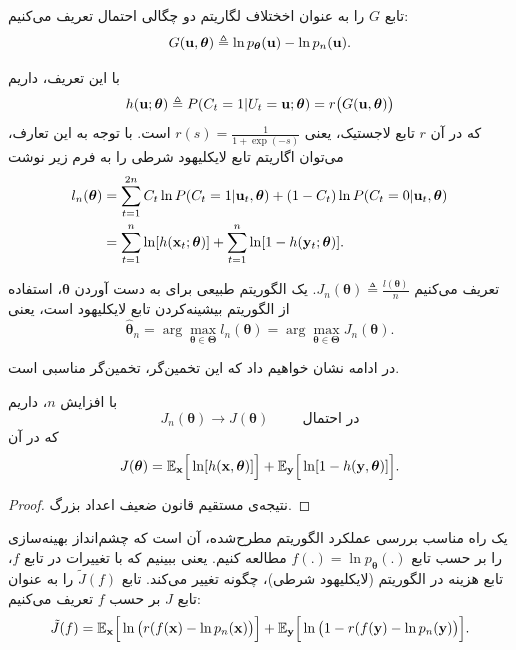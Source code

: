 \documentclass[oneside]{thesis}
\begin{document}
تابع $G$ را به عنوان اخختلاف لگاریتم دو چگالی احتمال تعریف می‌کنیم:
 \begin{equation}
G(\mathbf{u}, \boldsymbol{\theta}) \triangleq \ln p_{\boldsymbol{\theta}}(\mathbf{u}) - \ln p_n (\mathbf{u}).
 \end{equation}
 
 با این تعریف،  داریم
 \begin{equation}
h(\mathbf{u}; \boldsymbol{\theta}) \triangleq P(C_t = 1 | U_t = \mathbf{u}; \boldsymbol{\theta})= r\big(G(\mathbf{u}, \boldsymbol{\theta})\big)
 \end{equation}
 که در آن $r$ تابع لاجستیک، یعنی 
$
r(s) = \frac{1}{1 + \exp(-s)}
$
است. با توجه به این تعارف، می‌توان اگاریتم تابع لایکلیهود شرطی را به فرم زیر نوشت
\begin{align*}
l_n(\boldsymbol\theta) &= \sum_{t = 1}^{2n} C_t \ln P(C_t = 1 | \mathbf{u}_t, \boldsymbol\theta) + (1- C_t)\ln P(C_t = 0 | \mathbf{u}_t, \boldsymbol\theta)\\
&=\sum_{t= 1}^{n}\ln[h(\mathbf{x}_t; \boldsymbol\theta)] + \sum_{t = 1}^{n} \ln[1 - h(\mathbf{y}_t; \boldsymbol{\theta})].
\end{align*}

تعریف می‌کنیم 
$J_n(\boldsymbol{\theta}) \triangleq \frac{l(\boldsymbol{\theta})}{n} $.
یک الگوریتم طبیعی برای به دست آوردن 
$\boldsymbol{\theta}$،
استفاده از الگوریتم بیشینه‌کردن تابع لایکلیهود است، یعنی
\begin{equation}
\hat{\boldsymbol{\theta}}_n = \arg\max_{\boldsymbol{\theta} \in \boldsymbol{\Theta}} l_n(\boldsymbol{\theta}) = \arg\max_{\boldsymbol{\theta} \in \boldsymbol{\Theta}} J_n(\boldsymbol{\theta}).
\end{equation}

در ادامه نشان خواهیم داد که این تخمین‌گر، تخمین‌گر مناسبی است.

\begin{theorem}
	با افزایش $n$، داریم
\begin{equation}
J_n(\boldsymbol{\theta}) \rightarrow J(\boldsymbol\theta)
\hspace{1cm}
\text{در احتمال}
\end{equation}
که در آن
$$
J(\boldsymbol\theta) = \mathbb{E}_{\mathbf{x}}\Big[\ln[h(\mathbf{x}, \boldsymbol\theta)]\Big] + \mathbb{E}_{\mathbf{y}}\Big[\ln[1 - h(\mathbf{y}, \boldsymbol\theta)]\Big].
$$
\end{theorem}
\begin{proof}
نتیجه‌ی مستقیم قانون ضعیف اعداد بزرگ.
\end{proof}


یک راه مناسب بررسی عملکرد الگوریتم مطرح‌شده، آن است که چشم‌انداز بهینه‌سازی 
را بر حسب تابع
$f(.) = \ln p_{\boldsymbol{\theta}}(.)$
مطالعه کنیم. یعنی ببینیم که با تغییرات در تابع 
$f$،
تابع هزینه‌ در الگوریتم (لایکلیهود شرطی)، چگونه تغییر می‌کند. تابع $\tilde{J}(f)$ را به عنوان تابع $J$ بر حسب $f$ تعریف می‌کنیم:
\begin{equation}
\tilde{J}(f) = \mathbb{E}_{\mathbf{x}}\Big[\ln\big(r(f(\mathbf{x}) - \ln p_n(\mathbf{x})\big)\Big] + \mathbb{E}_{\mathbf{y}}\Big[\ln\big(1 - r(f(\mathbf{y}) - \ln p_n(\mathbf{y})\big)\Big].
\end{equation}
\end{document}
